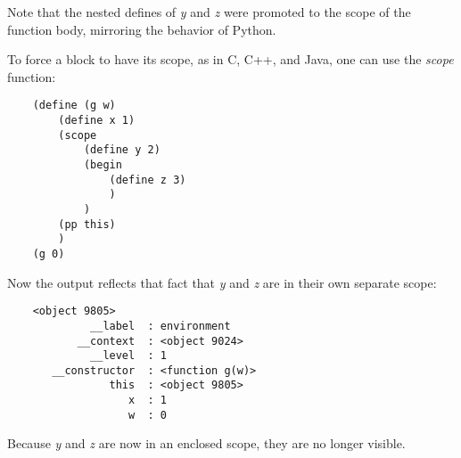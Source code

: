 Note that the nested defines of {\it y} and {\it z} were promoted
to the scope of the function body, mirroring the behavior of Python.

To force a block to have its scope, as in C, C++, and Java,
one can use the {\it scope} function:

\begin{verbatim}
    (define (g w)
        (define x 1)
        (scope
            (define y 2)
            (begin
                (define z 3)
                )
            )
        (pp this)
        )
    (g 0)
\end{verbatim}

Now the output reflects that fact that {\it y} and {\it z} are in their own
separate scope:

\begin{verbatim}
    <object 9805>
             __label  : environment
           __context  : <object 9024>
             __level  : 1
       __constructor  : <function g(w)>
                this  : <object 9805>
                   x  : 1
                   w  : 0
\end{verbatim}

Because {\it y} and {\it z} are now in an enclosed scope,
they are no longer visible.


